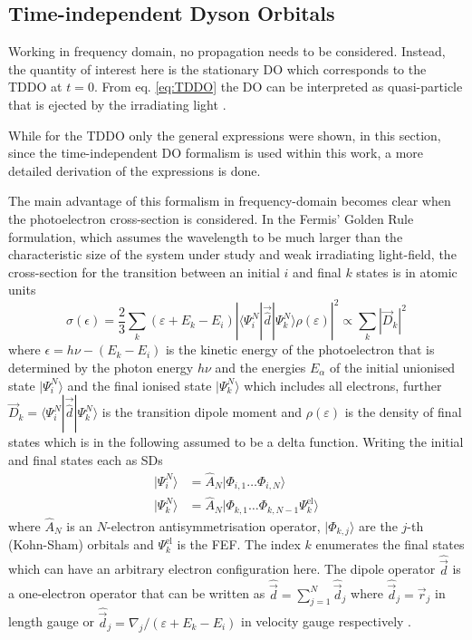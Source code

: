 \subsection{Time-independent Dyson Orbitals}
Working in frequency domain, no propagation needs to be considered.
Instead, the quantity of interest here is the stationary DO which corresponds to the TDDO at $t=0$.
From eq. \ref{eq:TDDO} the DO can be interpreted as quasi-particle that is ejected by the irradiating light \cite{ezDyson}.

While for the TDDO only the general expressions were shown, in this section, since the time-independent DO formalism is used within this work, a more detailed derivation of the expressions is done.

The main advantage of this formalism in frequency-domain becomes clear when the photoelectron cross-section is considered.
In the Fermis' Golden Rule \cite{fgr} formulation, which assumes the wavelength to be much larger than the characteristic size of the system under study and weak irradiating light-field, the cross-section for the transition between an initial $i$ and final $k$ states is in atomic units \cite{richardsFD,MAgg}
\begin{equation} \label{eq:sigma}
\sigma(\epsilon) =\frac 23
           \sum_k (\varepsilon +E_k-E_i)\left| \langle \Psi^N_i | \vec{\hat{d}} | \Psi^N_{k}\rangle \rho(\varepsilon)
\right|^2  
             \propto \sum_k \left|  \vec{D}_k \right| ^2
\end{equation}
where $\epsilon=h\nu-(E_k-E_i)$ is the kinetic energy of the photoelectron that is determined by the photon energy $h\nu$ and the energies $E_\alpha$ of the initial unionised state $|\Psi^N_i \rangle$ and the final ionised state $|\Psi^N_k\rangle$ which includes all electrons, further $\vec{D}_k=\langle \Psi^N_i | \vec{\hat{d}} | \Psi^N_{k}\rangle$ is the transition dipole moment and $\rho(\varepsilon)$ is the density of final states which is in the following assumed to be a delta function.
Writing the initial and final states each as SDs
\begin{subequations} \label{eq:SDs} \begin{align}
   |\Psi^N_i\rangle &= \hat{A}_N | \Phi_{i,1} \hdots \Phi_{i,N} \rangle \\
   |\Psi^N_k \rangle &= \hat{A}_N | \Phi_{k,1}\hdots \Phi_{k,N-1} \Psi_k^\text{el} \rangle
\end{align}\end{subequations}
where $\hat{A}_N$ is an $N$-electron antisymmetrisation operator, $|\Phi_{k,j}\rangle$ are the $j$-th (Kohn-Sham) orbitals and $\Psi_k^\text{el}$ is the FEF.
The index $k$ enumerates the final states which can have an arbitrary electron configuration here.
The dipole operator $\hat{\vec{d}}$ is a one-electron operator that can be written as $\hat{\vec{d}}=\sum_{j=1}^N \hat{\vec{d}}_j$ where $\hat{\vec{d}}_j=\vec{r}_j$ in length gauge or $\hat{\vec{d}}_j=\nabla_j/(\varepsilon +E_k-E_i)$ in velocity gauge respectively \cite{richardsFD}.

